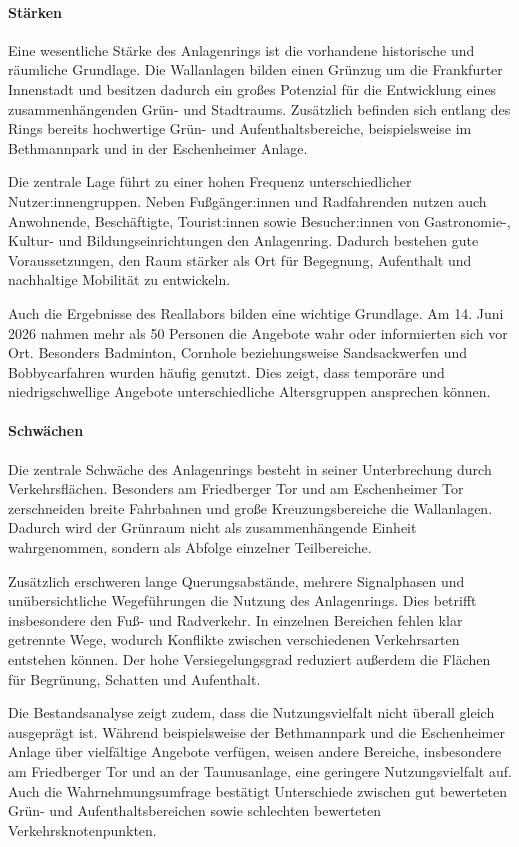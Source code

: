 \documentclass[a4paper,12pt]{article}
\begin{document}
\paragraph{Stärken}

Eine wesentliche Stärke des Anlagenrings ist die vorhandene historische und räumliche Grundlage. Die Wallanlagen bilden einen Grünzug um die Frankfurter Innenstadt und besitzen dadurch ein großes Potenzial für die Entwicklung eines zusammenhängenden Grün- und Stadtraums. Zusätzlich befinden sich entlang des Rings bereits hochwertige Grün- und Aufenthaltsbereiche, beispielsweise im Bethmannpark und in der Eschenheimer Anlage.

Die zentrale Lage führt zu einer hohen Frequenz unterschiedlicher Nutzer:innengruppen. Neben Fußgänger:innen und Radfahrenden nutzen auch Anwohnende, Beschäftigte, Tourist:innen sowie Besucher:innen von Gastronomie-, Kultur- und Bildungseinrichtungen den Anlagenring. Dadurch bestehen gute Voraussetzungen, den Raum stärker als Ort für Begegnung, Aufenthalt und nachhaltige Mobilität zu entwickeln.

Auch die Ergebnisse des Reallabors bilden eine wichtige Grundlage. Am 14. Juni 2026 nahmen mehr als 50 Personen die Angebote wahr oder informierten sich vor Ort. Besonders Badminton, Cornhole beziehungsweise Sandsackwerfen und Bobbycarfahren wurden häufig genutzt. Dies zeigt, dass temporäre und niedrigschwellige Angebote unterschiedliche Altersgruppen ansprechen können.

\paragraph{Schwächen}

Die zentrale Schwäche des Anlagenrings besteht in seiner Unterbrechung durch Verkehrsflächen. Besonders am Friedberger Tor und am Eschenheimer Tor zerschneiden breite Fahrbahnen und große Kreuzungsbereiche die Wallanlagen. Dadurch wird der Grünraum nicht als zusammenhängende Einheit wahrgenommen, sondern als Abfolge einzelner Teilbereiche.

Zusätzlich erschweren lange Querungsabstände, mehrere Signalphasen und unübersichtliche Wegeführungen die Nutzung des Anlagenrings. Dies betrifft insbesondere den Fuß- und Radverkehr. In einzelnen Bereichen fehlen klar getrennte Wege, wodurch Konflikte zwischen verschiedenen Verkehrsarten entstehen können. Der hohe Versiegelungsgrad reduziert außerdem die Flächen für Begrünung, Schatten und Aufenthalt.

Die Bestandsanalyse zeigt zudem, dass die Nutzungsvielfalt nicht überall gleich ausgeprägt ist. Während beispielsweise der Bethmannpark und die Eschenheimer Anlage über vielfältige Angebote verfügen, weisen andere Bereiche, insbesondere am Friedberger Tor und an der Taunusanlage, eine geringere Nutzungsvielfalt auf. Auch die Wahrnehmungsumfrage bestätigt Unterschiede zwischen gut bewerteten Grün- und Aufenthaltsbereichen sowie schlechten bewerteten Verkehrsknotenpunkten.
\end{document}
